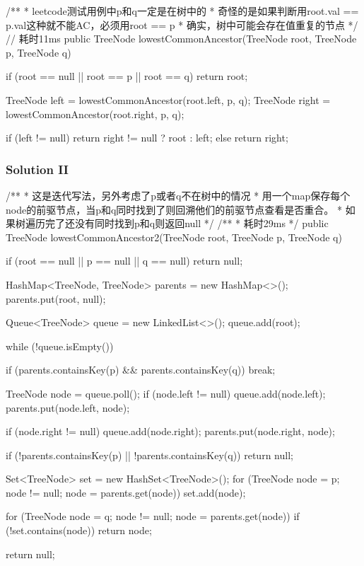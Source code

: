 \begin{Code}
/**
 * leetcode测试用例中p和q一定是在树中的
 * 奇怪的是如果判断用root.val == p.val这种就不能AC，必须用root == p
 * 确实，树中可能会存在值重复的节点
 */
// 耗时11ms
public TreeNode lowestCommonAncestor(TreeNode root, TreeNode p, TreeNode q) {
    if (root == null || root == p || root == q) {
        return root;
    }

    TreeNode left = lowestCommonAncestor(root.left, p, q);
    TreeNode right = lowestCommonAncestor(root.right, p, q);

    if (left != null) {
        return right != null ? root : left;
    } else {
        return right;
    }
}
\end{Code}

\newpage

\subsubsection{Solution II}

\begin{Code}

/**
 * 这是迭代写法，另外考虑了p或者q不在树中的情况
 * 用一个map保存每个node的前驱节点，当p和q同时找到了则回溯他们的前驱节点查看是否重合。
 * 如果树遍历完了还没有同时找到p和q则返回null
 */
/**
 * 耗时29ms
 */
public TreeNode lowestCommonAncestor2(TreeNode root, TreeNode p, TreeNode q) {
    if (root == null || p == null || q == null) {
        return null;
    }

    HashMap<TreeNode, TreeNode> parents = new HashMap<>();
    parents.put(root, null);

    Queue<TreeNode> queue = new LinkedList<>();
    queue.add(root);

    while (!queue.isEmpty()) {
        if (parents.containsKey(p) && parents.containsKey(q)) {
            break;
        }

        TreeNode node = queue.poll();
        if (node.left != null) {
            queue.add(node.left);
            parents.put(node.left, node);
        }

        if (node.right != null) {
            queue.add(node.right);
            parents.put(node.right, node);
        }
    }

    if (!parents.containsKey(p) || !parents.containsKey(q)) {
        return null;
    }

    Set<TreeNode> set = new HashSet<TreeNode>();
    for (TreeNode node = p; node != null; node = parents.get(node)) {
        set.add(node);
    }

    for (TreeNode node = q; node != null; node = parents.get(node)) {
        if (!set.contains(node)) {
            return node;
        }
    }

    return null;
}
\end{Code}

